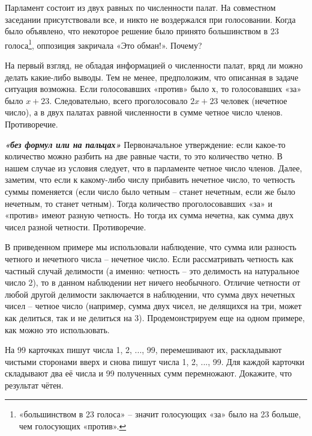 \begin{thm}
	Парламент состоит из двух равных по численности палат. На совместном заседании присутствовали все, и никто не воздержался при голосовании. Когда было объявлено, что некоторое решение было принято большинством в 23 голоса\footnote{«большинством в 23 голоса» – значит голосующих «за» было на 23 больше, чем голосующих «против».},  оппозиция закричала «Это обман!». Почему?
\end{thm}

\begin{prf}
	На первый взгляд, не обладая информацией о численности палат, вряд ли можно делать какие-либо выводы. Тем не менее, предположим, что описанная в задаче ситуация возможна. Если голосовавших «против» было х, то голосовавших «за» было $x + 23$. Следовательно, всего проголосовало $2x + 23$ человек (нечетное число), а в двух палатах равной численности в сумме четное число членов. Противоречие.
\end{prf}
\begin{prf}
\textit{\textbf{«без формул или на пальцах»}} Первоначальное утверждение: если какое-то количество можно разбить на две равные части, то это количество четно. В нашем случае из условия следует, что в парламенте четное число членов. Далее, заметим, что если к какому-либо числу прибавить нечетное число, то четность суммы поменяется (если число было четным – станет нечетным, если же было нечетным, то станет четным). Тогда количество проголосовавших «за» и «против» имеют разную четность. Но тогда их сумма нечетна, как сумма двух чисел разной четности. Противоречие.
\end{prf}
\vfill
В приведенном примере мы использовали наблюдение, что сумма или разность четного и нечетного числа – нечетное число. Если рассматривать четность как частный случай делимости (а именно: четность – это делимость на натуральное число 2), то в данном наблюдении нет ничего необычного. Отличие четности от любой другой делимости заключается в наблюдении, что сумма двух нечетных чисел – четное число (например, сумма двух чисел, не делящихся на три, может как делиться, так и не делиться на 3). Продемонстрируем еще на одном примере, как можно это использовать.

\begin{thm}
	На 99 карточках пишут числа 1, 2, ..., 99, перемешивают их, раскладывают чистыми сторонами вверх и снова пишут числа 1, 2, ..., 99. Для каждой карточки складывают два её числа и 99 полученных сумм перемножают. Докажите, что результат чётен.
\end{thm}

